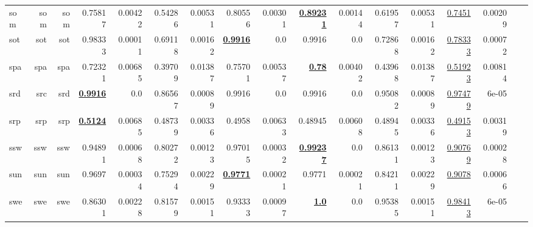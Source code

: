 \documentclass[11pt]{article}
\begin{document}
\begin{table*}[h]
{\begin{tabular}{lrrrrrrrrrrrrrrrr}
som         & som         & som         & 0.75817         & 0.00422         & 0.54286         & 0.00531         & 0.80556         & 0.00301         & \textbf{\underline{0.89231}}         & 0.00144         & 0.61957         & 0.00531         & \underline{0.7451}         & 0.00209         \\
sot         & sot         & sot         & 0.98333         & 0.00011         & 0.69118         & 0.00162         & \textbf{\underline{0.9916}}         & 0.0         & 0.9916         & 0.0         & 0.72868         & 0.00162         & \underline{0.78333}         & 0.00072         \\
spa         & spa         & spa         & 0.72321         & 0.00685         & 0.39709         & 0.01387         & 0.75701         & 0.00537         & \textbf{\underline{0.78}}         & 0.00402         & 0.43968         & 0.01387         & \underline{0.51923}         & 0.00814         \\
srd         & src         & srd         & \textbf{\underline{0.9916}}         & 0.0         & 0.86567         & 0.00089         & 0.9916         & 0.0         & 0.9916         & 0.0         & 0.95082         & 0.00089         & \underline{0.97479}         & 6e-05         \\
srp         & srp         & srp         & \textbf{\underline{0.5124}}         & 0.00685         & 0.48739         & 0.00336         & 0.4958         & 0.00633         & 0.48945         & 0.00608         & 0.48945         & 0.00336         & \underline{0.49153}         & 0.00319         \\
ssw         & ssw         & ssw         & 0.94891         & 0.00068         & 0.80272         & 0.00123         & 0.97015         & 0.00032         & \textbf{\underline{0.99237}}         & 0.0         & 0.86131         & 0.00123         & \underline{0.90769}         & 0.00028         \\
sun         & sun         & sun         & 0.9697         & 0.00034         & 0.75294         & 0.00229         & \textbf{\underline{0.9771}}         & 0.00021         & 0.9771         & 0.00021         & 0.84211         & 0.00229         & \underline{0.9078}         & 0.00066         \\
swe         & swe         & swe         & 0.86301         & 0.00228         & 0.81579         & 0.00151         & 0.93333         & 0.00097         & \textbf{\underline{1.0}}         & 0.0         & 0.95385         & 0.00151         & \underline{0.98413}         & 6e-05         \\

\end{tabular}}
\end{table*}
\end{document}
